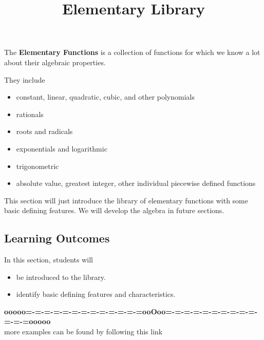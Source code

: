 \documentclass{ximera}
\title{Elementary Library}
\begin{document}
\begin{abstract}
\end{abstract}
\maketitle




The \textbf{Elementary Functions} is a collection of functions for which we know a lot about their algebraic properties.

They include 

\begin{itemize}
\item constant, linear, quadratic, cubic, and other polynomials
\item rationals
\item roots and radicals
\item exponentials and logarithmic
\item trigonometric
\item absolute value, greatest integer, other individual piecewise defined functions
\end{itemize}



This section will just introduce the library of elementary functions with some basic defining features.  We will develop the algebra in future sections.












\subsection{Learning Outcomes}

\begin{sectionOutcomes}
In this section, students will 

\begin{itemize}
\item be introduced to the library.
\item identify basic defining features and characteristics.
\end{itemize}
\end{sectionOutcomes}







\begin{center}
\textbf{\textcolor{green!50!black}{ooooo=-=-=-=-=-=-=-=-=-=-=-=-=ooOoo=-=-=-=-=-=-=-=-=-=-=-=-=ooooo}} \\

more examples can be found by following this link\\ 

\end{center}
\end{document}
